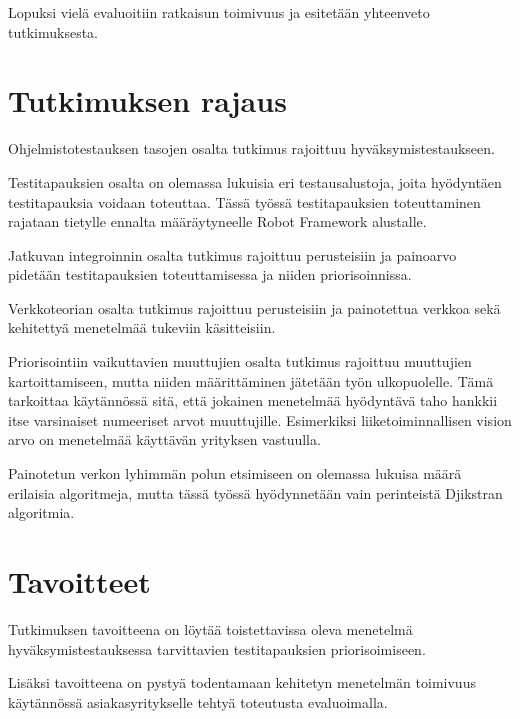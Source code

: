 Lopuksi vielä evaluoitiin ratkaisun toimivuus ja esitetään yhteenveto tutkimuksesta.


\section{Tutkimuksen rajaus} \label{06_tutkimuksen_rajaus}

Ohjelmistotestauksen tasojen osalta tutkimus rajoittuu hyväksymistestaukseen.

Testitapauksien osalta on olemassa lukuisia eri testausalustoja, joita hyödyntäen testitapauksia voidaan toteuttaa. Tässä työssä testitapauksien toteuttaminen rajataan tietylle ennalta määräytyneelle Robot Framework alustalle.

Jatkuvan integroinnin osalta tutkimus rajoittuu perusteisiin ja painoarvo pidetään testitapauksien toteuttamisessa ja niiden priorisoinnissa.

Verkkoteorian osalta tutkimus rajoittuu perusteisiin ja painotettua verkkoa sekä kehitettyä menetelmää tukeviin käsitteisiin.

Priorisointiin vaikuttavien muuttujien osalta tutkimus rajoittuu muuttujien kartoittamiseen, mutta niiden määrittäminen jätetään työn ulkopuolelle. Tämä tarkoittaa käytännössä sitä, että jokainen menetelmää hyödyntävä taho hankkii itse varsinaiset numeeriset arvot muuttujille. Esimerkiksi liiketoiminnallisen vision arvo on menetelmää käyttävän yrityksen vastuulla.

Painotetun verkon lyhimmän polun etsimiseen on olemassa lukuisa määrä erilaisia algoritmeja, mutta tässä työssä hyödynnetään vain perinteistä Djikstran algoritmia.

\section{Tavoitteet} \label{06_tavoitteet}

Tutkimuksen tavoitteena on löytää toistettavissa oleva menetelmä hyväksymistestauksessa tarvittavien testitapauksien priorisoimiseen.

Lisäksi tavoitteena on pystyä todentamaan kehitetyn menetelmän toimivuus käytännössä asiakasyritykselle tehtyä toteutusta evaluoimalla.
